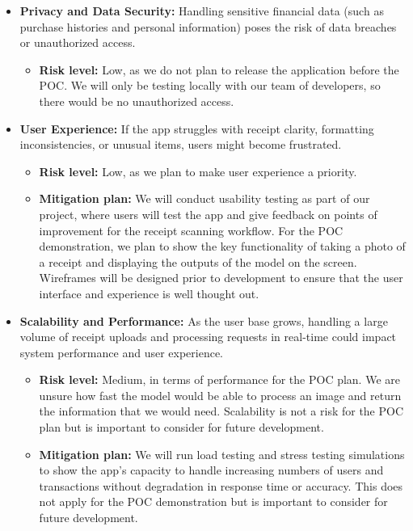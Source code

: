 \documentclass{article}
\begin{document}
\begin{itemize}
    \item \textbf{Privacy and Data Security:} Handling sensitive financial data (such as purchase histories and personal information) poses the risk of data breaches or unauthorized access.
    \begin{itemize}
        \item \textbf{Risk level:} Low, as we do not plan to release the application before the POC. We will only be testing locally with our team of developers, so there would be no unauthorized access.
    \end{itemize}
    
    \item \textbf{User Experience:} If the app struggles with receipt clarity, formatting inconsistencies, or unusual items, users might become frustrated.
    \begin{itemize}
        \item \textbf{Risk level:} Low, as we plan to make user experience a priority.
        \item \textbf{Mitigation plan:} We will conduct usability testing as part of our project, where users will test the app and give feedback on points of improvement for the receipt scanning workflow. For the POC demonstration, we plan to show the key functionality of taking a photo of a receipt and displaying the outputs of the model on the screen. Wireframes will be designed prior to development to ensure that the user interface and experience is well thought out.
    \end{itemize}
    
    \item \textbf{Scalability and Performance:} As the user base grows, handling a large volume of receipt uploads and processing requests in real-time could impact system performance and user experience.
    \begin{itemize}
        \item \textbf{Risk level:} Medium, in terms of performance for the POC plan. We are unsure how fast the model would be able to process an image and return the information that we would need. Scalability is not a risk for the POC plan but is important to consider for future development.
        \item \textbf{Mitigation plan:} We will run load testing and stress testing simulations to show the app’s capacity to handle increasing numbers of users and transactions without degradation in response time or accuracy. This does not apply for the POC demonstration but is important to consider for future development.
    \end{itemize}
\end{itemize}
\end{document}
